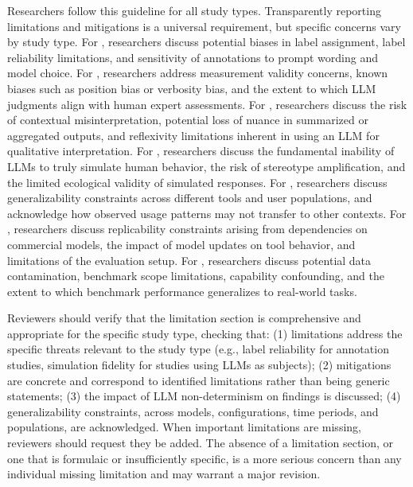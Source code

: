 Researchers \must follow this guideline for all study types. Transparently reporting limitations and mitigations is a universal requirement, but specific concerns vary by study type.
For \annotators, researchers \must discuss potential biases in label assignment, label reliability limitations, and sensitivity of annotations to prompt wording and model choice.
For \judges, researchers \must address measurement validity concerns, known biases such as position bias or verbosity bias, and the extent to which LLM judgments align with human expert assessments.
For \synthesis, researchers \must discuss the risk of contextual misinterpretation, potential loss of nuance in summarized or aggregated outputs, and reflexivity limitations inherent in using an LLM for qualitative interpretation.
For \subjects, researchers \must discuss the fundamental inability of LLMs to truly simulate human behavior, the risk of stereotype amplification, and the limited ecological validity of simulated responses.
For \llmusage, researchers \must discuss generalizability constraints across different tools and user populations, and acknowledge how observed usage patterns may not transfer to other contexts.
For \newtools, researchers \must discuss replicability constraints arising from dependencies on commercial models, the impact of model updates on tool behavior, and limitations of the evaluation setup.
For \benchmarkingtasks, researchers \must discuss potential data contamination, benchmark scope limitations, capability confounding, and the extent to which benchmark performance generalizes to real-world tasks.


Reviewers should verify that the limitation section is comprehensive and appropriate for the specific study type, checking that:
(1) limitations address the specific threats relevant to the study type (e.g., label reliability for annotation studies, simulation fidelity for studies using LLMs as subjects);
(2) mitigations are concrete and correspond to identified limitations rather than being generic statements;
(3) the impact of LLM non-determinism on findings is discussed;
(4) generalizability constraints, across models, configurations, time periods, and populations, are acknowledged.
When important limitations are missing, reviewers should request they be added. The absence of a limitation section, or one that is formulaic or insufficiently specific, is a more serious concern than any individual missing limitation and may warrant a major revision.

